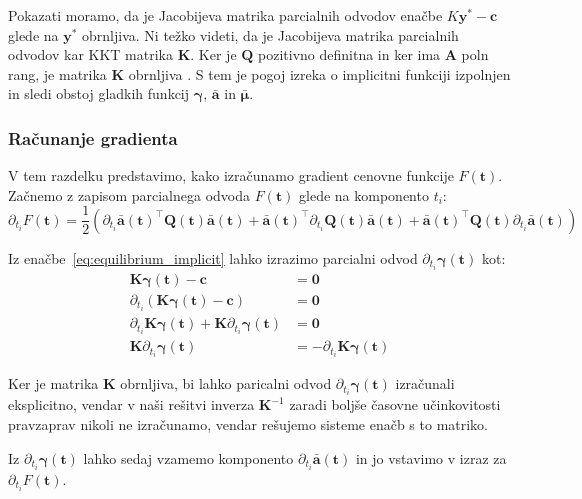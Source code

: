 \documentclass[mat2, tisk]{fmfdelo}
\newcommand{\aimplicit}{\bar{\mathbf{a}}}
\newcommand{\muimplicit}{\bar{\mathbf{\mu}}}
\newcommand{\yimplicit}{\mathbf{\gamma}}
\newcommand{\qmat}{\mathbf{Q}}
\newcommand{\kmat}{\mathbf{K}}
\newcommand{\tvec}{\mathbf{t}}
\begin{document}
\begin{dokaz}
Pokazati moramo, da je Jacobijeva matrika parcialnih odvodov enačbe $K\mathbf{y}^* - \mathbf{c}$ glede na $\mathbf{y}^*$ obrnljiva. Ni težko videti, da je Jacobijeva matrika parcialnih odvodov kar KKT matrika $\mathbf{K}$. Ker je $\mathbf{Q}$ pozitivno definitna in ker ima $\mathbf{A}$ poln rang, je matrika $\mathbf{K}$ obrnljiva \cite{EPFL_Part5}. S tem je pogoj izreka o implicitni funkciji izpolnjen in sledi obstoj gladkih funkcij $\yimplicit$, $\aimplicit$ in $\muimplicit$.
\end{dokaz}

\subsubsection{Računanje gradienta}

V tem razdelku predstavimo, kako izračunamo gradient cenovne funkcije $F(\tvec)$. Začnemo z zapisom parcialnega odvoda $F(\tvec)$ glede na komponento $t_i$:
\begin{equation}
    \partial_{t_i} F(\tvec) = \frac{1}{2} \left( \partial_{t_i} \aimplicit(\tvec)^\top \qmat(\tvec) \aimplicit(\tvec) + \aimplicit(\tvec)^\top \partial_{t_i} \qmat(\tvec) \aimplicit(\tvec) + \aimplicit(\tvec)^\top \qmat(\tvec) \partial_{t_i} \aimplicit(\tvec) \right)
\end{equation}

Iz enačbe~\eqref{eq:equilibrium_implicit} lahko izrazimo parcialni odvod $\partial_{t_i} \yimplicit(\tvec)$ kot:
\begin{equation}
    \begin{aligned}
        \kmat \yimplicit(\tvec) - \mathbf{c} &= \mathbf{0} \\
        \partial_{t_i}(\kmat \yimplicit(\tvec) - \mathbf{c}) &= \mathbf{0} \\
        \partial_{t_i}\kmat \yimplicit(\tvec) + \kmat \partial_{t_i} \yimplicit(\tvec) &= \mathbf{0} \\
        \kmat \partial_{t_i} \yimplicit(\tvec) &= - \partial_{t_i}\kmat \yimplicit(\tvec)
    \end{aligned}
\end{equation}

Ker je matrika $\kmat$ obrnljiva, bi lahko paricalni odvod $\partial_{t_i} \yimplicit(\tvec)$ izračunali eksplicitno, vendar v naši rešitvi inverza $\kmat^{-1}$ zaradi boljše časovne učinkovitosti pravzaprav nikoli ne izračunamo, vendar rešujemo sisteme enačb s to matriko.

Iz $\partial_{t_i} \yimplicit(\tvec)$ lahko sedaj vzamemo komponento $\partial_{t_i} \aimplicit(\tvec)$ in jo vstavimo v izraz za $\partial_{t_i} F(\tvec)$.
\end{document}
